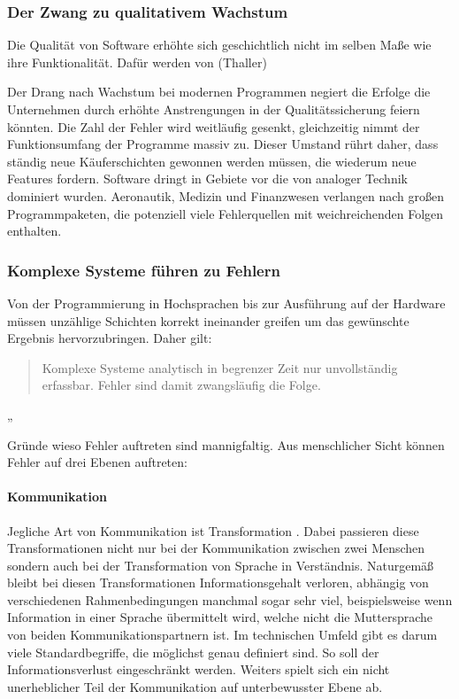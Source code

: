 \subsubsection{Der Zwang zu qualitativem Wachstum}
Die Qualität von Software erhöhte sich geschichtlich nicht im selben Maße wie ihre Funktionalität. Dafür werden von (Thaller)\cite{thaller_software-test:_2002}

Der Drang nach Wachstum bei modernen Programmen negiert die Erfolge die Unternehmen durch erhöhte Anstrengungen in der Qualitätssicherung feiern könnten. Die Zahl der Fehler wird weitläufig gesenkt,  gleichzeitig nimmt der Funktionsumfang der Programme massiv zu. Dieser Umstand rührt daher, dass ständig neue Käuferschichten gewonnen werden müssen, die wiederum neue Features fordern.
Software dringt in Gebiete vor die von analoger Technik dominiert wurden. Aeronautik, Medizin und Finanzwesen verlangen nach großen Programmpaketen, die potenziell viele Fehlerquellen mit weichreichenden Folgen enthalten.

\subsubsection{Komplexe Systeme führen zu Fehlern}
Von der Programmierung in Hochsprachen bis zur Ausführung auf der Hardware müssen unzählige Schichten korrekt ineinander greifen um das gewünschte Ergebnis hervorzubringen. 
Daher gilt:

\begin{quote}
Komplexe Systeme analytisch in begrenzer Zeit nur unvollständig erfassbar. Fehler sind damit zwangsläufig die Folge. \cite{vigenschow_objektorientiertes_2004}
\end{quote} „

Gründe wieso Fehler auftreten sind mannigfaltig. Aus menschlicher Sicht können Fehler auf drei Ebenen auftreten: \cite{vigenschow_objektorientiertes_2004}

\paragraph{Kommunikation}
Jegliche Art von Kommunikation ist Transformation \cite{shannon_mathematische_1976}. Dabei passieren diese Transformationen nicht nur bei der Kommunikation zwischen zwei Menschen sondern auch bei der Transformation von Sprache in Verständnis. Naturgemäß bleibt bei diesen Transformationen Informationsgehalt verloren, abhängig von verschiedenen Rahmenbedingungen manchmal sogar sehr viel, beispielsweise wenn Information in einer Sprache übermittelt wird, welche nicht die Muttersprache von beiden Kommunikationspartnern ist.
Im technischen Umfeld gibt es darum viele Standardbegriffe, die möglichst genau definiert sind. So soll der Informationsverlust eingeschränkt werden.
Weiters spielt sich ein nicht unerheblicher Teil der Kommunikation auf unterbewusster Ebene ab.

